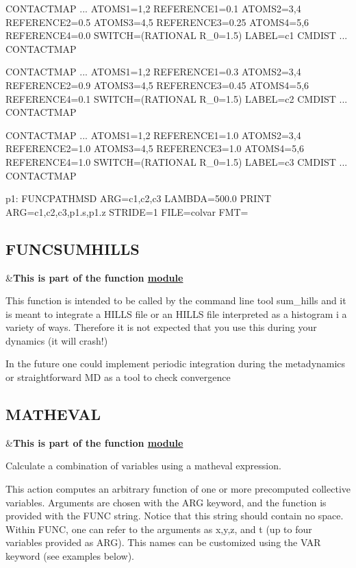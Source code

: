 \begin{DoxyVerb}CONTACTMAP ...
ATOMS1=1,2 REFERENCE1=0.1  
ATOMS2=3,4 REFERENCE2=0.5  
ATOMS3=4,5 REFERENCE3=0.25  
ATOMS4=5,6 REFERENCE4=0.0  
SWITCH=(RATIONAL R_0=1.5) 
LABEL=c1
CMDIST
... CONTACTMAP

CONTACTMAP ...
ATOMS1=1,2 REFERENCE1=0.3  
ATOMS2=3,4 REFERENCE2=0.9  
ATOMS3=4,5 REFERENCE3=0.45  
ATOMS4=5,6 REFERENCE4=0.1  
SWITCH=(RATIONAL R_0=1.5) 
LABEL=c2
CMDIST
... CONTACTMAP

CONTACTMAP ...
ATOMS1=1,2 REFERENCE1=1.0  
ATOMS2=3,4 REFERENCE2=1.0  
ATOMS3=4,5 REFERENCE3=1.0  
ATOMS4=5,6 REFERENCE4=1.0  
SWITCH=(RATIONAL R_0=1.5) 
LABEL=c3
CMDIST
... CONTACTMAP

p1: FUNCPATHMSD ARG=c1,c2,c3 LAMBDA=500.0 
PRINT ARG=c1,c2,c3,p1.s,p1.z STRIDE=1 FILE=colvar FMT=%
\end{DoxyVerb}
 \hypertarget{FUNCSUMHILLS}{}\subsection{F\+U\+N\+C\+S\+U\+M\+H\+I\+L\+L\+S}\label{FUNCSUMHILLS}
\begin{TabularC}{2}
\hline
&{\bfseries  This is part of the function \hyperlink{mymodules}{module }}   \\
\end{TabularC}
This function is intended to be called by the command line tool sum\+\_\+hills and it is meant to integrate a H\+I\+L\+L\+S file or an H\+I\+L\+L\+S file interpreted as a histogram i a variety of ways. Therefore it is not expected that you use this during your dynamics (it will crash!)

In the future one could implement periodic integration during the metadynamics or straightforward M\+D as a tool to check convergence \hypertarget{MATHEVAL}{}\subsection{M\+A\+T\+H\+E\+V\+A\+L}\label{MATHEVAL}
\begin{TabularC}{2}
\hline
&{\bfseries  This is part of the function \hyperlink{mymodules}{module }}   \\
\end{TabularC}
Calculate a combination of variables using a matheval expression.

This action computes an arbitrary function of one or more precomputed collective variables. Arguments are chosen with the A\+R\+G keyword, and the function is provided with the F\+U\+N\+C string. Notice that this string should contain no space. Within F\+U\+N\+C, one can refer to the arguments as x,y,z, and t (up to four variables provided as A\+R\+G). This names can be customized using the V\+A\+R keyword (see examples below).

